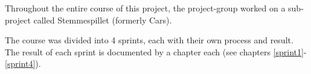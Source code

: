 Throughout the entire course of this project, the project-group worked on a sub-project called Stemmespillet (formerly Cars).

The course was divided into 4 sprints, each with their own process and result.
The result of each sprint is documented by a chapter each (see chapters \ref{sprint1}-\ref{sprint4}).